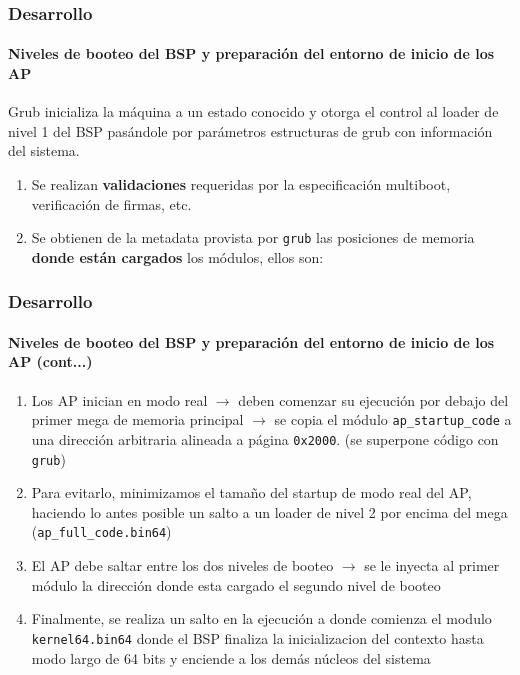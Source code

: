 \documentclass{beamer}
\begin{document}
\begin{frame}
  \frametitle{Desarrollo}
  \framesubtitle{Niveles de booteo del BSP y preparación del entorno de inicio de los AP}
  \small Grub inicializa la máquina a un estado conocido y otorga el control al loader de nivel 1 del BSP pasándole por parámetros estructuras de grub con información del sistema.
  \pause
  \begin{enumerate}
  \item Se realizan \textbf{validaciones} requeridas por la especificación multiboot, verificación de firmas, etc.
  \pause
  \item Se obtienen de la metadata provista por \texttt{grub} las posiciones de memoria \textbf{donde están cargados} los módulos, ellos son:
  \vspace{0.1cm}
  \end{enumerate}
\end{frame}

\begin{frame}
  \frametitle{Desarrollo}
  \framesubtitle{Niveles de booteo del BSP y preparación del entorno de inicio de los AP (cont...)}
  \begin{enumerate}
    \setlength{\itemsep}{10pt}
   \small
  \item Los AP inician en modo real $\rightarrow$ deben comenzar su ejecución por debajo del primer mega de memoria principal $\rightarrow$
  se copia el módulo \texttt{ap\_startup\_code} a una dirección arbitraria alineada a página \texttt{0x2000}. (se superpone código con \texttt{grub})
  \pause  
  \item Para evitarlo, minimizamos el tamaño del startup de modo real del AP, haciendo lo antes posible un salto a un loader de nivel 2 por encima del mega (\texttt{ap\_full\_code.bin64})
  \pause
  \item El AP debe saltar entre los dos niveles de booteo $\rightarrow$ se le inyecta al primer módulo la dirección donde esta cargado el segundo nivel de booteo
  \pause
  \item Finalmente, se realiza un salto en la ejecución a donde comienza el modulo \texttt{kernel64.bin64} donde el BSP finaliza la inicializacion del contexto hasta modo largo de 64 bits y enciende a los demás núcleos del sistema
  \end{enumerate}
\end{frame}
\end{document}

